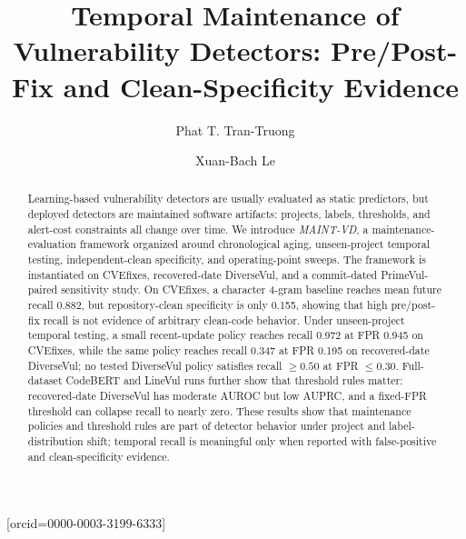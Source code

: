 \documentclass[a4paper,fleqn]{cas-dc}
\begin{document}
\title[mode=title]{Temporal Maintenance of Vulnerability Detectors: Pre/Post-Fix and Clean-Specificity Evidence}

\author[1,2]{Phat T. Tran-Truong}[orcid=0000-0003-3199-6333]

\author[1,2]{Xuan-Bach Le}



\address[1]{Faculty of Computer Science and Engineering, Ho Chi Minh City
University of Technology (HCMUT), 268 Ly Thuong Kiet Street, Dien Hong Ward, Ho
Chi Minh City, Vietnam}
\address[2]{Vietnam National University Ho Chi Minh City, Linh Xuan Ward, Ho
Chi Minh City, Vietnam}

\begin{abstract}
Learning-based vulnerability detectors are usually evaluated as static
predictors, but deployed detectors are maintained software artifacts: projects,
labels, thresholds, and alert-cost constraints all change over time. We
introduce \emph{MAINT-VD}, a maintenance-evaluation framework organized around
chronological aging, unseen-project temporal testing, independent-clean
specificity, and operating-point sweeps. The
framework is instantiated on CVEfixes, recovered-date DiverseVul, and a
commit-dated PrimeVul-paired sensitivity study. On CVEfixes, a character
4-gram baseline reaches mean future recall 0.882, but
repository-clean specificity is only 0.155, showing that high
pre/post-fix recall is not evidence of arbitrary clean-code behavior. Under
unseen-project temporal testing, a small recent-update policy reaches recall
0.972 at FPR 0.945 on CVEfixes, while the same policy reaches
recall 0.347 at FPR 0.195 on recovered-date DiverseVul; no
tested DiverseVul policy satisfies recall \(\geq 0.50\) at FPR \(\leq 0.30\).
Full-dataset CodeBERT and LineVul runs further show that threshold rules
matter: recovered-date DiverseVul has moderate AUROC but low AUPRC, and a
fixed-FPR threshold can collapse recall to nearly zero. These results show that
maintenance policies and threshold rules are part of detector behavior under
project and label-distribution shift; temporal recall is meaningful only when
reported with false-positive and clean-specificity evidence.
\end{abstract}
\end{document}
